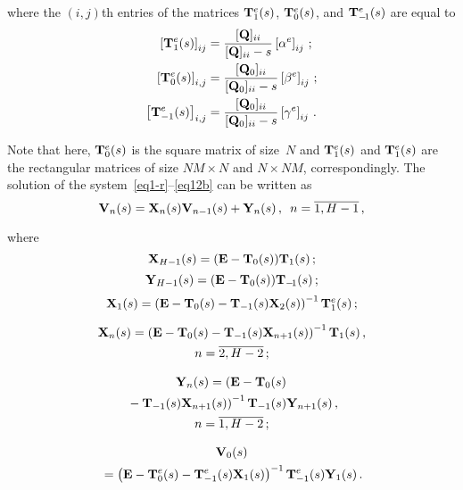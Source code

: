 \begin{multicols}{2}
\noindent 
where the $(i,j)${th} entries of the matrices 
$\mathbf{T}^e_{1}(s)$, $\mathbf{T}^e_0(s)$, and $\mathbf{T}^e_{-\!1}(s)$
are equal to 
\begin{align*}
\left[ \mathbf{T}^e_1(s) \right]_{ij}
&=
\displaystyle\frac{\displaystyle [\mathbf{Q}]_{ii} \mathstrut}{\displaystyle [\mathbf{Q}]_{ii} - s\mathstrut}
\left[\alpha^{e}\right]_{ij}\,;
\\
\left[ \mathbf{T}^e_0(s) \right]_{i,j}
&=
\displaystyle\frac{\displaystyle [\mathbf{Q}_0]_{ii}\mathstrut}{\displaystyle [\mathbf{Q}_0]_{ii} - s\mathstrut}
\left[\beta^{e}\right]_{ij}
\,;
\\
\left[ \mathbf{T}^e_{-1}(s) \right]_{i,j}
&=
\displaystyle\frac{\displaystyle [\mathbf{Q}_0]_{ii}\mathstrut}{\displaystyle [\mathbf{Q}_0]_{ii} - s\mathstrut}
\left[\gamma^{e}\right]_{ij}\,.
\end{align*}

\noindent 
Note that here, $\mathbf{T}^e_0(s)$ is the square matrix of size~$N$
and $\mathbf{T}^e_1(s) $ and $\mathbf{T}^e_1(s)$ are the
rectangular matrices of size $NM\times N$ and $N\times NM$,
correspondingly.
The solution of the system~\eqref{eq1-r}--\eqref{eq12b}
can be written as 
$$
\mathbf{V}_{n}(s)=\mathbf{X}_{n}(s) \mathbf{V}_{n-1}(s)+\mathbf{Y}_{n}(s)\,,
\enskip n=\overline{1,H-1}\,,
$$

\noindent where 
$$
\mathbf{X}_{H-1}(s)=(\mathbf{E}-\mathbf{T}_0(s))\mathbf{T}_1(s)\,;
$$
$$
\mathbf{Y}_{H-1}(s)=(\mathbf{E}-\mathbf{T}_0(s))\mathbf{T}_{-\!1}(s)\,;
$$
$$
\mathbf{X}_{1}(s)=
\left(\mathbf{E}-\mathbf{T}_0(s)-\mathbf{T}_{-1}(s)\mathbf{X}_{2}(s)\right)^{-1}\mathbf{T}^e_1(s)\,; 
$$

\vspace*{-12pt}

\noindent
\begin{multline*}
\mathbf{X}_{n}(s)=\left(\mathbf{E}-\mathbf{T}_0(s)-\mathbf{T}_{-1}(s)\mathbf{X}_{n+1}(s)\right)^{-1}
\mathbf{T}_1(s)\,, \\
n=\overline{2,H-2}\,;
\end{multline*}

\vspace*{-12pt}

\noindent
\begin{multline*}
\mathbf{Y}_{n}(s)=\left(\mathbf{E}-\mathbf{T}_0(s)\right.\\
\left.{}-\mathbf{T}_{-1}(s)\mathbf{X}_{n+1}(s)\right)^{-1}
\mathbf{T}_{-1}(s)\mathbf{Y}_{n+1}(s)\,,
\\ 
 n=\overline{1,H-2}\,;
\end{multline*}

\vspace*{-12pt}

\noindent
\begin{multline*}
\mathbf{V}_{0}(s)\\
{}=\left(\mathbf{E}-\mathbf{T}^e_0(s)-\mathbf{T}^e_{-1}(s)\mathbf{X}_{1}(s)
\right)^{-1}\mathbf{T}^e_{-1}(s)\mathbf{Y}_{1}(s)\,. 
\end{multline*}


\end{multicols}
